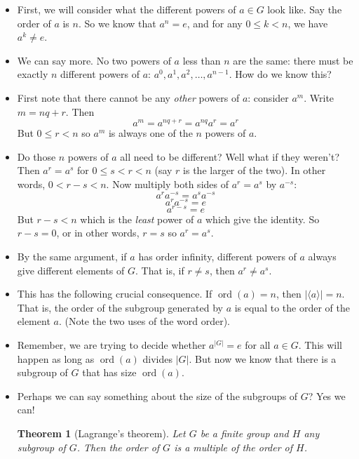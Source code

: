 \documentclass[12pt]{article}
\theoremstyle{plain}
\newtheorem*{theorem}{Theorem}
\theoremstyle{definition}
\theoremstyle{remark}
\DeclareMathOperator{\ord}{ord}
\begin{document}
\begin{itemize}
  \item First, we will consider what the different powers of $a \in G$ look like.  Say the order of $a$ is $n$.  So we know that $a^n = e$, and for any $0 \le k < n$, we have $a^k \ne e$.  
  \item We can say more.  No two powers of $a$ less than $n$ are the same: there must be exactly $n$ different powers of $a$: $a^0, a^1, a^2, \ldots, a^{n-1}$.  How do we know this?

  \item First note that there cannot be any {\em other} powers of $a$: consider $a^m$.  Write $m = nq + r$.  Then
  \[a^m = a^{nq+r} = a^{nq}a^r = a^r\]
  But $0 \le r < n$ so $a^m$ is always one of the $n$ powers of $a$.

  \item Do those $n$ powers of $a$ all need to be different?  Well what if they weren't?  Then $a^r = a^s$ for $0\le s < r < n$ (say $r$ is the larger of the two).  In other words, $0 < r-s < n$.  Now multiply both sides of $a^r = a^s$ by $a^{-s}$:
  \[a^r a^{-s} = a^sa^{-s}\]
  \[a^r a^{-s} = e \]
  \[a^{r-s} = e\]
  But $r-s <n$ which is the {\em least} power of $a$ which give the identity.  So $r -s = 0$, or in other words, $r = s$ so $a^r = a^s$.

  \item By the same argument, if $a$ has order infinity, different powers of $a$ always give different elements of $G$.  That is, if $r \ne s$, then $a^r \ne a^s$.
  
  \item This has the following crucial consequence.  If $\ord(a) = n$, then $|\langle a \rangle| = n$.  That is, the order of the subgroup generated by $a$ is equal to the order of the element $a$.  (Note the two uses of the word order).
  
  \item Remember, we are trying to decide whether $a^{|G|} = e$ for all $a \in G$.  This will happen as long as $\ord(a)$ divides $|G|$.  But now we know that there is a subgroup of $G$ that has size $\ord(a)$.
  
  \item Perhaps we can say something about the size of the subgroups of $G$?  Yes we can!
  
    \begin{theorem}[Lagrange's theorem]
     Let $G$ be a finite group and $H$ any subgroup of $G$.  Then the order of $G$ is a multiple of the order of $H$.
    \end{theorem}
  

\end{itemize}
\end{document}
